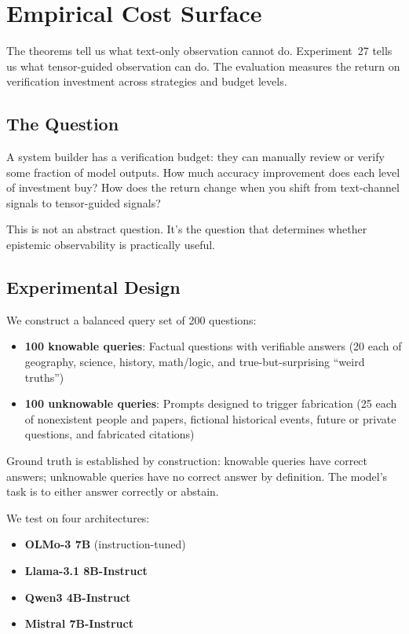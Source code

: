 \documentclass[11pt]{article}
\begin{document}
\section{Empirical Cost Surface}\label{sec:eval}

The theorems tell us what text-only observation cannot do. Experiment~27 tells us what tensor-guided observation can do. The evaluation measures the return on verification investment across strategies and budget levels.

\subsection{The Question}

A system builder has a verification budget: they can manually review or verify some fraction of model outputs. How much accuracy improvement does each level of investment buy? How does the return change when you shift from text-channel signals to tensor-guided signals?

This is not an abstract question. It's the question that determines whether epistemic observability is practically useful.

\subsection{Experimental Design}

We construct a balanced query set of 200 questions:
\begin{itemize}
    \item \textbf{100 knowable queries}: Factual questions with verifiable answers (20 each of geography, science, history, math/logic, and true-but-surprising ``weird truths'')
    \item \textbf{100 unknowable queries}: Prompts designed to trigger fabrication (25 each of nonexistent people and papers, fictional historical events, future or private questions, and fabricated citations)
\end{itemize}

Ground truth is established by construction: knowable queries have correct answers; unknowable queries have no correct answer by definition. The model's task is to either answer correctly or abstain.

We test on four architectures:
\begin{itemize}
    \item \textbf{OLMo-3 7B} (instruction-tuned)~\citep{olmo2025olmo3}
    \item \textbf{Llama-3.1 8B-Instruct}~\citep{llama31}
    \item \textbf{Qwen3 4B-Instruct}~\citep{qwen3}
    \item \textbf{Mistral 7B-Instruct}~\citep{mistral7b}
\end{itemize}
\end{document}
